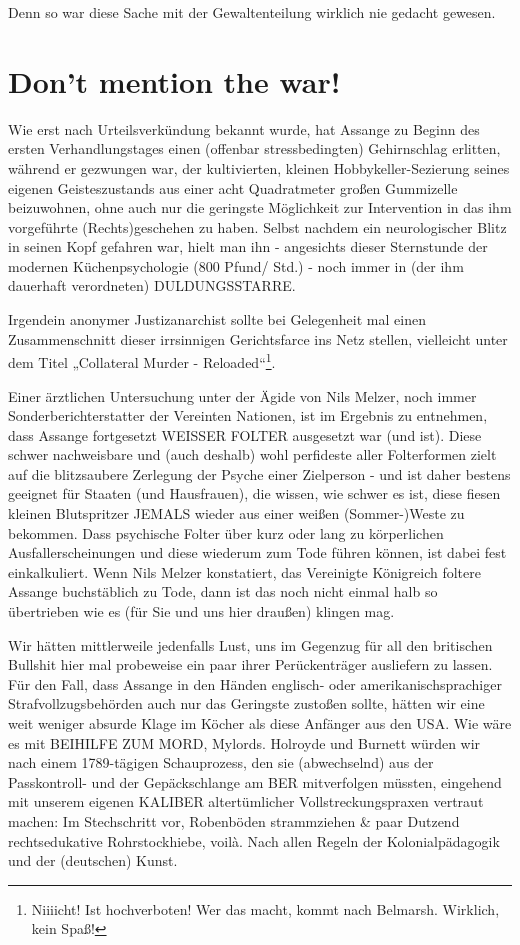 \begin{multicols}{2}
Denn so war diese Sache mit der Gewaltenteilung wirklich nie gedacht gewesen.


\section{Don’t mention the war!} %
Wie erst nach Urteilsverkündung bekannt wurde, hat Assange zu Beginn des ersten Verhandlungstages einen (offenbar stressbedingten) Gehirnschlag erlitten, während
er gezwungen war, der kultivierten, kleinen Hobbykeller-Sezierung seines eigenen Geisteszustands aus einer
acht Quadratmeter großen Gummizelle beizuwohnen,
ohne auch nur die geringste Möglichkeit zur Intervention in das ihm vorgeführte (Rechts)geschehen zu haben.
Selbst nachdem ein neurologischer Blitz in seinen Kopf
gefahren war, hielt man ihn - angesichts dieser Sternstunde der modernen Küchenpsychologie (800 Pfund/
Std.) - noch immer in (der ihm dauerhaft verordneten)
DULDUNGSSTARRE.

Irgendein anonymer Justizanarchist sollte bei Gelegenheit mal einen Zusammenschnitt dieser irrsinnigen Gerichtsfarce ins Netz stellen, vielleicht unter dem Titel
„Collateral Murder - Reloaded“\footnote[35]{Niiiicht! Ist hochverboten! Wer das macht, kommt nach Belmarsh. Wirklich, kein Spaß!}.

Einer ärztlichen Untersuchung unter der Ägide von Nils
Melzer, noch immer Sonderberichterstatter der Vereinten Nationen, ist im Ergebnis zu entnehmen, dass Assange fortgesetzt WEISSER FOLTER ausgesetzt war (und
ist). Diese schwer nachweisbare und (auch deshalb)
wohl perfideste aller Folterformen zielt auf die blitzsaubere Zerlegung der Psyche einer Zielperson - und ist daher bestens geeignet für Staaten (und Hausfrauen), die
wissen, wie schwer es ist, diese fiesen kleinen Blutspritzer JEMALS wieder aus einer weißen (Sommer-)Weste zu
bekommen. Dass psychische Folter über kurz oder lang
zu körperlichen Ausfallerscheinungen und diese wiederum zum Tode führen können, ist dabei fest einkalkuliert.
Wenn Nils Melzer konstatiert, das Vereinigte Königreich
foltere Assange buchstäblich zu Tode, dann ist das noch
nicht einmal halb so übertrieben wie es (für Sie und uns
hier draußen) klingen mag.

Wir hätten mittlerweile jedenfalls Lust, uns im Gegenzug für all den britischen Bullshit hier mal probeweise
ein paar ihrer Perückenträger ausliefern zu lassen. Für
den Fall, dass Assange in den Händen englisch- oder
amerikanischsprachiger Strafvollzugsbehörden auch
nur das Geringste zustoßen sollte, hätten wir eine weit
weniger absurde Klage im Köcher als diese Anfänger
aus den USA. Wie wäre es mit BEIHILFE ZUM MORD,
Mylords. Holroyde und Burnett würden wir nach einem
1789-tägigen Schauprozess, den sie (abwechselnd) aus
der Passkontroll- und der Gepäckschlange am BER mitverfolgen müssten, eingehend mit unserem eigenen KALIBER altertümlicher Vollstreckungspraxen vertraut machen: Im Stechschritt vor, Robenböden strammziehen
\& paar Dutzend rechtsedukative Rohrstockhiebe, voilà.
Nach allen Regeln der Kolonialpädagogik und der (deutschen) Kunst.


\end{multicols}
